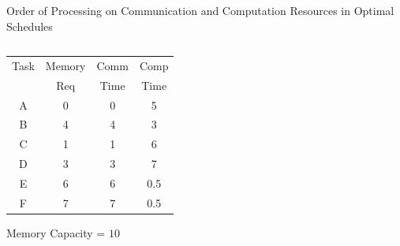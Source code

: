 \documentclass[mathserif,hyperref={pdfpagemode=FullScreen}]{beamer}
\newcommand{\task}[6][0]{
	\node[comm=#2 start #3 length #4 color #6]{};
	\node[comp=#2 start #3+#4+#1 length #5 color #6]{}; 
}
\begin{document}
\begin{frame}[fragile]{Order of Processing on Communication and Computation Resources in Optimal Schedules}
\begin{columns}

	
	\begin{column}[c]{.35\linewidth}
		\footnotesize
		\begin{center}
\begin{tabular}{|c|c|c|c|}
	\hline
	Task & Memory & Comm & Comp\\
	& Req & Time & Time\\ \hline 
	A & 0 & 0 & 5\\ \hline
	B & 4 & 4 & 3\\ \hline
	C & 1 & 1 & 6\\ \hline
	D & 3 & 3 & 7\\ \hline
	E & 6 & 6 & 0.5\\ \hline
	F & 7 & 7 & 0.5\\ \hline
\end{tabular}
		\end{center}


Memory Capacity = $10$
	\end{column}

	\newcommand{\taskA}[1]{\node[comp=$A$ start #1 length 5 color cyan] {};}
	\newcommand{\taskB}[2][0]{\task[#1]{$B$}{#2}{4}{3}{blue!25!white}}
	\newcommand{\taskC}[2][0]{\task[#1]{$C$}{#2}{1}{6}{blue!50!white}}
	\newcommand{\taskD}[2][0]{\task[#1]{$D$}{#2}{3}{7}{blue!75!white}}
	\newcommand{\taskE}[2][0]{\node[comm=$E$ start #2 length 6 color green!25!white]{};%
	\node[comp={} start #2+6+#1 length 0.5 color green!25!white]{};}
	\newcommand{\taskF}[2][0]{\node[comm=$F$ start #2 length 7 color green!50!white]{};%
	\node[comp={} start #2+7+#1 length 0.5 color green!50!white]{};}





\end{columns}
\end{frame}
\end{document}
